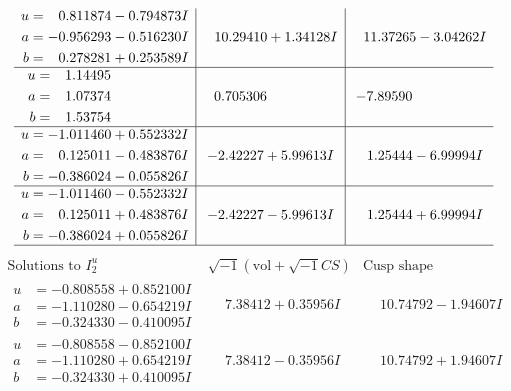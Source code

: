 \documentclass[1p]{elsarticle_modified}
\theoremstyle{definition}
\newcommand{\I}{\sqrt{-1}}
\begin{document}
$$\begin{array}{c|c|c}
\begin{aligned}
u &= \phantom{-}0.811874 - 0.794873 I \\
a &= -0.956293 - 0.516230 I \\
b &= \phantom{-}0.278281 + 0.253589 I\end{aligned}
 & \phantom{-}10.29410 + 1.34128 I & \phantom{-}11.37265 - 3.04262 I \\ \hline\begin{aligned}
u &= \phantom{-}1.14495\phantom{ +0.000000I} \\
a &= \phantom{-}1.07374\phantom{ +0.000000I} \\
b &= \phantom{-}1.53754\phantom{ +0.000000I}\end{aligned}
 & \phantom{-}0.705306\phantom{ +0.000000I} & -7.89590\phantom{ +0.000000I} \\ \hline\begin{aligned}
u &= -1.011460 + 0.552332 I \\
a &= \phantom{-}0.125011 - 0.483876 I \\
b &= -0.386024 - 0.055826 I\end{aligned}
 & -2.42227 + 5.99613 I & \phantom{-}1.25444 - 6.99994 I \\ \hline\begin{aligned}
u &= -1.011460 - 0.552332 I \\
a &= \phantom{-}0.125011 + 0.483876 I \\
b &= -0.386024 + 0.055826 I\end{aligned}
 & -2.42227 - 5.99613 I & \phantom{-}1.25444 + 6.99994 I\\
 \hline 
 \end{array}$$\newpage$$\begin{array}{c|c|c}  
\text{Solutions to }I^u_{2}& \I (\text{vol} + \sqrt{-1}CS) & \text{Cusp shape}\\
 \hline 
\begin{aligned}
u &= -0.808558 + 0.852100 I \\
a &= -1.110280 - 0.654219 I \\
b &= -0.324330 - 0.410095 I\end{aligned}
 & \phantom{-}7.38412 + 0.35956 I & \phantom{-}10.74792 - 1.94607 I \\ \hline\begin{aligned}
u &= -0.808558 - 0.852100 I \\
a &= -1.110280 + 0.654219 I \\
b &= -0.324330 + 0.410095 I\end{aligned}
 & \phantom{-}7.38412 - 0.35956 I & \phantom{-}10.74792 + 1.94607 I \\ \hline\begin{aligned}

\end{aligned}
\end{array}$$
\end{document}
